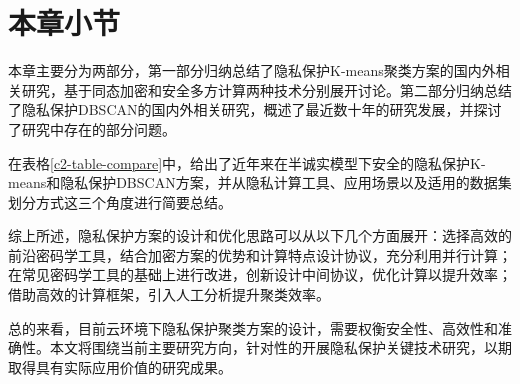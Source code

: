 \newpage
\section{本章小节}
本章主要分为两部分，第一部分归纳总结了隐私保护K-means聚类方案的国内外相关研究，基于同态加密和安全多方计算两种技术分别展开讨论。第二部分归纳总结了隐私保护DBSCAN的国内外相关研究，概述了最近数十年的研究发展，并探讨了研究中存在的部分问题。

在表格\ref{c2-table-compare}中，给出了近年来在半诚实模型下安全的隐私保护K-means和隐私保护DBSCAN方案，并从隐私计算工具、应用场景以及适用的数据集划分方式这三个角度进行简要总结。

\begin{table}[htbp]
	\centering	
	\renewcommand{\arraystretch}{1.3}
	\caption{半诚实模型下安全的隐私保护聚类方案}
	\label{c2-table-compare}
\end{table}

综上所述，隐私保护方案的设计和优化思路可以从以下几个方面展开：选择高效的前沿密码学工具，结合加密方案的优势和计算特点设计协议，充分利用并行计算\cite{wu2020secure}；在常见密码学工具的基础上进行改进，创新设计中间协议，优化计算以提升效率\cite{mohassel2019practical}；借助高效的计算框架，引入人工分析提升聚类效率\cite{bozdemir2021privacy}。

总的来看，目前云环境下隐私保护聚类方案的设计，需要权衡安全性、高效性和准确性。本文将围绕当前主要研究方向，针对性的开展隐私保护关键技术研究，以期取得具有实际应用价值的研究成果。


